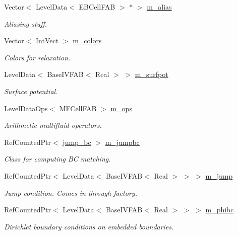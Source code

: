 \begin{DoxyCompactItemize}
\item 
Vector$<$ Level\+Data$<$ E\+B\+Cell\+F\+AB $>$ $\ast$ $>$ \hyperlink{classmfconductivityop_a5ae0e536cd2648df3e3a7154a8d28abc}{m\+\_\+alias}
\begin{DoxyCompactList}\small\item\em Aliasing stuff. \end{DoxyCompactList}\item 
Vector$<$ Int\+Vect $>$ \hyperlink{classmfconductivityop_aff705c53e9c783326ce713f05006e558}{m\+\_\+colors}
\begin{DoxyCompactList}\small\item\em Colors for relaxation. \end{DoxyCompactList}\item 
Level\+Data$<$ Base\+I\+V\+F\+AB$<$ Real $>$ $>$ \hyperlink{classmfconductivityop_a2b1de8dbf2635f429899bdf88870388f}{m\+\_\+surfpot}
\begin{DoxyCompactList}\small\item\em Surface potential. \end{DoxyCompactList}\item 
Level\+Data\+Ops$<$ M\+F\+Cell\+F\+AB $>$ \hyperlink{classmfconductivityop_a5cb617af2cd3c9bc89143308251c2451}{m\+\_\+ops}
\begin{DoxyCompactList}\small\item\em Arithmetic multifluid operators. \end{DoxyCompactList}\item 
Ref\+Counted\+Ptr$<$ \hyperlink{classjump__bc}{jump\+\_\+bc} $>$ \hyperlink{classmfconductivityop_ad60577ff83d8edf2199182caf45bab04}{m\+\_\+jumpbc}
\begin{DoxyCompactList}\small\item\em Class for computing BC matching. \end{DoxyCompactList}\item 
Ref\+Counted\+Ptr$<$ Level\+Data$<$ Base\+I\+V\+F\+AB$<$ Real $>$ $>$ $>$ \hyperlink{classmfconductivityop_a4396aca09bb70bc27b406a93c2aabdc2}{m\+\_\+jump}
\begin{DoxyCompactList}\small\item\em Jump condition. Comes in through factory. \end{DoxyCompactList}\item 
Ref\+Counted\+Ptr$<$ Level\+Data$<$ Base\+I\+V\+F\+AB$<$ Real $>$ $>$ $>$ \hyperlink{classmfconductivityop_a344e21018863e2a1b4984a625af891c3}{m\+\_\+phibc}
\begin{DoxyCompactList}\small\item\em Dirichlet boundary conditions on embedded boundaries. \end{DoxyCompactList}\item 

\end{DoxyCompactItemize}
